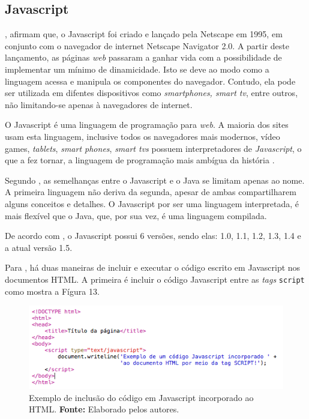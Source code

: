 \subsection{Javascript}

, afirmam que, o Javascript foi criado e lançado pela Netscape em 1995, em conjunto com o navegador de internet Netscape Navigator 2.0. A partir deste lançamento, as páginas \textit{web} passaram a ganhar vida com a possibilidade de implementar um mínimo de dinamicidade. Isto se deve ao modo como a linguagem acessa e manipula os componentes do navegador. Contudo, ela pode ser utilizada em difentes dispositivos como \textit{smartphones, smart tv}, entre outros, não limitando-se apenas à navegadores de internet.

O Javascript é uma linguagem de programação para \textit{web}. A maioria dos sites usam esta linguagem, inclusive todos os navegadores mais modernos, vídeo games, \textit{tablets}, \textit{smart phones}, \textit{smart tvs} possuem interpretadores de \textit{Javascript}, o que a fez tornar, a linguagem de programação mais ambígua da história \cite{flanagan_javascript_definitive_guide}.

Segundo , as semelhanças entre o Javascript e o Java se limitam apenas ao nome. A primeira linguagem não deriva da segunda, apesar de ambas compartilharem alguns conceitos e detalhes. O Javascript por ser uma linguagem interpretada, é mais flexível que o Java, que, por sua vez, é uma linguagem compilada.

De acordo com , o Javascript possui 6 versões, sendo elas: 1.0, 1.1, 1.2, 1.3, 1.4 e a atual versão 1.5.

Para , há duas maneiras de incluir e executar o código escrito em Javascript nos documentos HTML. A primeira é incluir o código Javascript entre as \textit{tags} \texttt{script} como mostra a Fígura 13. 

\begin{figure}[h!]
	\centerline{\includegraphics[scale=0.8]{./imagens/javascript_code.png}}
	\caption[Exemplo de inclusão do código em Javascript incorporado ao HTML]
	{Exemplo de inclusão do código em Javascript incorporado ao HTML. \textbf{Fonte:} Elaborado pelos autores.}
	\label{fig:exemplo1}
\end{figure}


